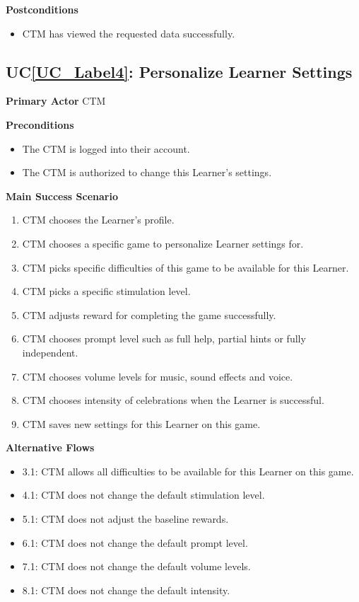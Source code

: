 \documentclass[12pt]{article}
\newcounter{ucnum} %
\newcommand{\ucref}[1]{UC\ref{#1}}
\begin{document}
\textbf{Postconditions}
\begin{itemize}
\item CTM has viewed the requested data successfully.
\end{itemize}

 \label{UC_Label4}
\subsection{\ucref{UC_Label4}: Personalize Learner Settings}

\textbf{Primary Actor}
CTM

\textbf{Preconditions}
\begin{itemize}
\item The CTM is logged into their account.
\item The CTM is authorized to change this Learner's settings.
\end{itemize}

\textbf{Main Success Scenario}
\begin{enumerate}
\item CTM chooses the Learner's profile.
\item CTM chooses a specific game to personalize Learner settings for.
\item CTM picks specific difficulties of this game to be available for this Learner.
\item CTM picks a specific stimulation level.
\item CTM adjusts reward for completing the game successfully.
\item CTM chooses prompt level such as full help, partial hints or fully independent.
\item CTM chooses volume levels for music, sound effects and voice.
\item CTM chooses intensity of celebrations when the Learner is successful.
\item CTM saves new settings for this Learner on this game.
\end{enumerate}

\textbf{Alternative Flows}
\begin{itemize}
\item 3.1: CTM allows all difficulties to be available for this Learner on this game.

\item 4.1: CTM does not change the default stimulation level.

\item 5.1: CTM does not adjust the baseline rewards.

\item 6.1: CTM does not change the default prompt level.

\item 7.1: CTM does not change the default volume levels.

\item 8.1: CTM does not change the default intensity.
\end{itemize}
\end{document}

